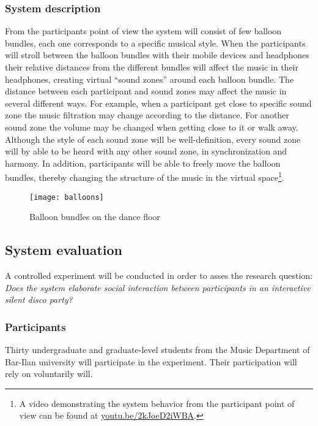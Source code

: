 \subsubsection{System description}\label{systemdescription}


From the participants point of view the system will consist of few balloon bundles, each one corresponds to a specific musical style.
When the participants will stroll between the balloon bundles with their mobile devices and headphones their relative distances from the different bundles will affect the music in their headphones, creating virtual ``sound zones'' around each balloon bundle.
The distance between each participant and sound zones may affect the music in several different ways.
For example, when a participant get close to specific sound zone the music filtration may change according to the distance.
For another sound zone the volume may be changed when getting close to it or walk away.
Although the style of each sound zone will be well-definition, every sound zone will by able to be heard with any other sound zone, in synchronization and harmony.
In addition, participants will be able to freely move the balloon bundles, thereby changing the structure of the music in the virtual space\footnote{A video demonstrating the system behavior from the participant point of view can be found at \href{http://youtu.be/2kJoeD2iWBA}{youtu.be/2kJoeD2iWBA}.}.

\begin{figure}[h]
	\texttt{[image: balloons]}
	\caption{Balloon bundles on the dance floor}
\end{figure}

\subsection{System evaluation}\label{methods:evaluation}

A controlled experiment will be conducted in order to asses the research question: \emph{Does the system elaborate social interaction between participants in an interactive silent disco party?}

\subsubsection{Participants}

Thirty undergraduate and graduate-level students from the Music Department of Bar-Ilan university will participate in the experiment.
Their participation will rely on voluntarily will.

